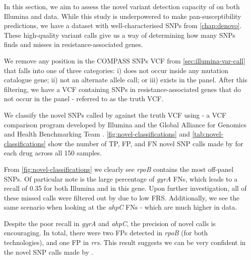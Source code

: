 In this section, we aim to assess the novel variant detection capacity of \drprg{} on both Illumina and \ont{} data. While this study is underpowered to make pan-susceptibility predictions, we have a dataset with well-characterised SNPs from \autoref{chap:denovo}. These high-quality variant calls give us a way of determining how many SNPs \drprg{} finds and misses in resistance-associated genes. 

We remove any position in the COMPASS SNPs VCF from \autoref{sec:illumina-var-call} that falls into one of three categories: i) does not occur inside any mutation catalogue gene; ii) not an alternate allele call; or iii) exists in the panel. After this filtering, we have a VCF containing SNPs in resistance-associated genes that do not occur in the panel - referred to as the truth VCF.

We classify the novel SNPs called by \drprg{} against the truth VCF using  - a VCF comparison program developed by Illumina and the Global Alliance for Genomics and Health Benchmarking Team \cite{happy2019}. \autoref{fig:novel-classifications} and \autoref{tab:novel-classifications} show the number of TP, FP, and FN novel SNP calls made by \drprg{} for each drug across all 150 samples. 

From \autoref{fig:novel-classifications} we clearly see \textit{rpoB} contains the most off-panel SNPs. Of particular note is the large percentage of \textit{gyrA} FNs, which leads to a recall of 0.35 for both Illumina and \ont{} in this gene. Upon further investigation, all of these missed calls were filtered out by \drprg{} due to low FRS. Additionally, we see the same scenario when looking at the \textit{ahpC} FNs - which are much higher in \ont{} data. 

Despite the poor recall in \textit{gyrA} and \textit{ahpC}, the precision of novel \drprg{} calls is encouraging. In total, there were two FPs detected in \textit{rpoB} (for both technologies), and one \ont{} FP in \textit{rrs}. This result suggests we can be very confident in the novel SNP calls made by \drprg{}.

